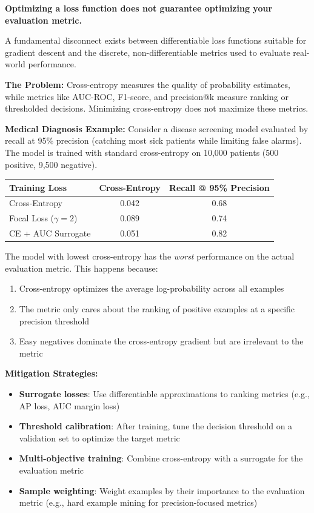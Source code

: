 \documentclass[../../main.tex]{subfiles}
\begin{document}
\begin{warning}
\textbf{Optimizing a loss function does not guarantee optimizing your evaluation metric.}

A fundamental disconnect exists between differentiable loss functions suitable for gradient descent and the discrete, non-differentiable metrics used to evaluate real-world performance.

\textbf{The Problem:} Cross-entropy measures the quality of probability estimates, while metrics like AUC-ROC, F1-score, and precision@k measure ranking or thresholded decisions. Minimizing cross-entropy does not maximize these metrics.

\textbf{Medical Diagnosis Example:} Consider a disease screening model evaluated by recall at 95\% precision (catching most sick patients while limiting false alarms). The model is trained with standard cross-entropy on 10,000 patients (500 positive, 9,500 negative).

\begin{center}
\begin{tabular}{@{}lcc@{}}
\toprule
\textbf{Training Loss} & \textbf{Cross-Entropy} & \textbf{Recall @ 95\% Precision} \\
\midrule
Cross-Entropy & 0.042 & 0.68 \\
Focal Loss ($\gamma=2$) & 0.089 & 0.74 \\
CE + AUC Surrogate & 0.051 & 0.82 \\
\bottomrule
\end{tabular}
\end{center}

The model with lowest cross-entropy has the \emph{worst} performance on the actual evaluation metric. This happens because:
\begin{enumerate}
    \item Cross-entropy optimizes the average log-probability across all examples
    \item The metric only cares about the ranking of positive examples at a specific precision threshold
    \item Easy negatives dominate the cross-entropy gradient but are irrelevant to the metric
\end{enumerate}

\textbf{Mitigation Strategies:}
\begin{itemize}
    \item \textbf{Surrogate losses}: Use differentiable approximations to ranking metrics (e.g., AP loss, AUC margin loss)
    \item \textbf{Threshold calibration}: After training, tune the decision threshold on a validation set to optimize the target metric
    \item \textbf{Multi-objective training}: Combine cross-entropy with a surrogate for the evaluation metric
    \item \textbf{Sample weighting}: Weight examples by their importance to the evaluation metric (e.g., hard example mining for precision-focused metrics)
\end{itemize}


\end{warning}
\end{document}
